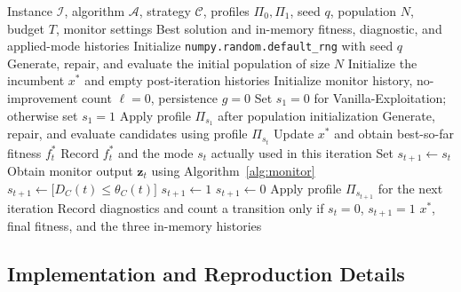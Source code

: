 \documentclass[mathematics,article,accept,moreauthors]{Definitions/mdpi}
\begin{document}
\begin{algorithm}[H]
\caption{\hl{Single} %
 \hl{run} %
 with explicit configuration-switching rules.}
\label{alg:run}
\footnotesize
\begin{algorithmic}[1]
\Require Instance $\mathcal I$, algorithm $\mathcal A$, strategy $\mathcal C$,
profiles $\Pi_0,\Pi_1$, seed $q$, population $N$, budget $T$, monitor settings
\Ensure Best solution and in-memory fitness, diagnostic, and applied-mode histories
\State Initialize \texttt{{numpy.random.default\_rng}} with seed $q$
\State Generate, repair, and evaluate the initial population of size $N$
\State Initialize the incumbent $x^*$ and empty post-iteration histories
\State Initialize monitor history, no-improvement count $\ell=0$, persistence $g=0$
\State Set $s_1=0$ for Vanilla-Exploitation; otherwise set $s_1=1$
\State Apply profile $\Pi_{s_1}$ after population initialization
  \State Generate, repair, and evaluate candidates using profile $\Pi_{s_t}$
  \State Update $x^*$ and obtain best-so-far fitness $f_t^*$
  \State Record $f_t^*$ and the mode $s_t$ actually used in this iteration
  \State Set $s_{t+1}\gets s_t$
    \State Obtain monitor output $\mathbf z_t$ using Algorithm~\ref{alg:monitor}
      \State $s_{t+1}\gets\mathbb[D_C(t)\leq\theta_C(t)]$
        \State $s_{t+1}\gets1$
        \State $s_{t+1}\gets0$
      \EndIf
    \EndIf
    \State Apply profile $\Pi_{s_{t+1}}$ for the next iteration
    \State Record diagnostics and count a transition only if $s_t=0$, $s_{t+1}=1$
  \EndIf
\EndFor
\State \Return $x^*$, final fitness, and the three in-memory histories
\end{algorithmic}
\end{algorithm}



\subsection{Implementation and Reproduction Details}
\label{subsec:reproduction}
\end{document}
